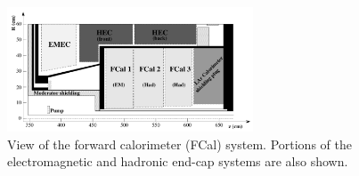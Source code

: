 \begin{figure}[!htb]
    \begin{center}
        \includegraphics[width=0.65\textwidth]{figures/chapter2/calorimeters/atlas_fcal}
        \caption{
            View of the forward calorimeter (FCal) system. Portions of the electromagnetic
            and hadronic end-cap systems are also shown.
        }
        \label{fig:fcal}
    \end{center}
\end{figure}
